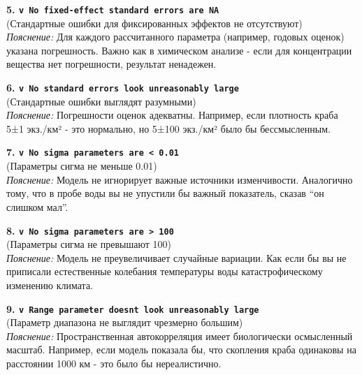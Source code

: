 \documentclass[
  letterpaper,
  DIV=11,
  numbers=noendperiod]{scrreprt}
\begin{document}
\begin{itemize}
  \textbf{5. \texttt{v\ No\ fixed-effect\ standard\ errors\ are\ NA}}\\
  (Стандартные ошибки для фиксированных эффектов не отсутствуют)\\
  \emph{Пояснение:} Для каждого рассчитанного параметра (например,
  годовых оценок) указана погрешность. Важно как в химическом анализе -
  если для концентрации вещества нет погрешности, результат ненадежен.

  \textbf{6.
  \texttt{v\ No\ standard\ errors\ look\ unreasonably\ large}}\\
  (Стандартные ошибки выглядят разумными)\\
  \emph{Пояснение:} Погрешности оценок адекватны. Например, если
  плотность краба 5±1 экз./км² - это нормально, но 5±100 экз./км² было
  бы бессмысленным.

  \textbf{7.
  \texttt{v\ No\ sigma\ parameters\ are\ \textless{}\ 0.01}}\\
  (Параметры сигма не меньше 0.01)\\
  \emph{Пояснение:} Модель не игнорирует важные источники изменчивости.
  Аналогично тому, что в пробе воды вы не упустили бы важный показатель,
  сказав ``он слишком мал''.

  \textbf{8.
  \texttt{v\ No\ sigma\ parameters\ are\ \textgreater{}\ 100}}\\
  (Параметры сигма не превышают 100)\\
  \emph{Пояснение:} Модель не преувеличивает случайные вариации. Как
  если бы вы не приписали естественные колебания температуры воды
  катастрофическому изменению климата.

  \textbf{9.
  \texttt{v\ Range\ parameter\ doesn\textquotesingle{}t\ look\ unreasonably\ large}}\\
  (Параметр диапазона не выглядит чрезмерно большим)\\
  \emph{Пояснение:} Пространственная автокорреляция имеет биологически
  осмысленный масштаб. Например, если модель показала бы, что скопления
  краба одинаковы на расстоянии 1000 км - это было бы нереалистично.
\end{itemize}
\end{document}

